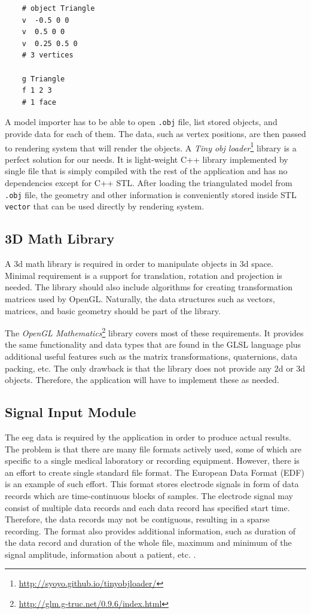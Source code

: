 \lstset{captionpos=b, caption=The .obj file example, label=lst:ObjFile}
\begin{lstlisting}
	# object Triangle
	v  -0.5 0 0
	v  0.5 0 0
	v  0.25 0.5 0
	# 3 vertices
	
	g Triangle
	f 1 2 3 
	# 1 face
\end{lstlisting}

A model importer has to be able to open \texttt{.obj} file, list stored objects, and provide data for each of them. The data, such as vertex positions, are then passed to rendering system that will render the objects. A \emph{Tiny obj loader}\footnote{\url{http://syoyo.github.io/tinyobjloader/}} library is a perfect solution for our needs. It is light-weight C++ library implemented by single file that is simply compiled with the rest of the application and has no dependencies except for C++ STL. After loading the triangulated model from \texttt{.obj} file, the geometry and other information is conveniently stored inside STL \texttt{vector} that can be used directly by rendering system.

\subsection{3D Math Library}
A \gls{3d} math library is required in order to manipulate objects in \gls{3d} space. Minimal requirement is a support for translation, rotation and projection is needed. The library should also include algorithms for creating transformation matrices used by OpenGL. Naturally, the data structures such as vectors, matrices, and basic geometry should be part of the library.

The \emph{OpenGL Mathematics}\footnote{\url{http://glm.g-truc.net/0.9.6/index.html}} library covers most of these requirements. It provides the same functionality and data types that are found in the GLSL language plus additional useful features such as the matrix transformations, quaternions, data packing, etc. The only drawback is that the library does not provide any \gls{2d} or \gls{3d} objects. Therefore, the application will have to implement these as needed. 

\subsection{Signal Input Module}
The \gls{eeg} data is required by the application in order to produce actual results. The problem is that there are many file formats actively used, some of which are specific to a single medical laboratory or recording equipment. However, there is an effort to create single standard file format. The European Data Format (EDF) is an example of such effort. This format stores electrode signals in form of data records which are time-continuous blocks of samples. The electrode signal may consist of multiple data records and each data record has specified start time. Therefore, the data records may not be contiguous, resulting in a sparse recording. The format also provides additional information, such as duration of the data record and duration of the whole file, maximum and minimum of the signal amplitude, information about a patient, etc. \cite{edfFormat}. 

